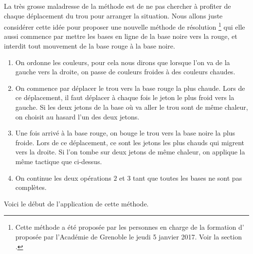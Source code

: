 La très grosse maladresse de la méthode  est de ne pas chercher à profiter de chaque déplacement du trou pour arranger la situation. Nous allons juste considérer cette idée pour proposer une nouvelle méthode de résolution
\footnote{
	Cette méthode a été proposée par les personnes en charge de la formation d' proposée par l'Académie de Grenoble le jeudi 5 janvier 2017. Voir la section .
}
qui elle aussi commence par mettre les bases en ligne de la base noire vers la rouge, et interdit tout mouvement de la base rouge à la base noire.

\begin{enumerate}
	\item On ordonne les couleurs, pour cela nous dirons que lorsque l'on va de la gauche vers la droite, on passe de couleurs froides à des couleurs chaudes.

	\item On commence par déplacer le trou vers la base rouge la plus chaude. Lors de ce déplacement, il faut déplacer à chaque fois le jeton le plus froid vers la gauche. Si les deux jetons de la base où va aller le trou sont de même chaleur, on choisit au hasard l'un des deux jetons.

	\item Une fois arrivé à la base rouge, on bouge le trou vers la base noire la plus froide. Lors de ce déplacement, ce sont les jetons les plus chauds qui migrent vers la droite. Si l'on tombe sur deux jetons de même chaleur, on applique la même tactique que ci-dessus.
	
	\item On continue les deux opérations $2$ et $3$ tant que toutes les bases ne sont pas complètes.
\end{enumerate}


Voici le début de l'application de cette méthode.

\medskip

